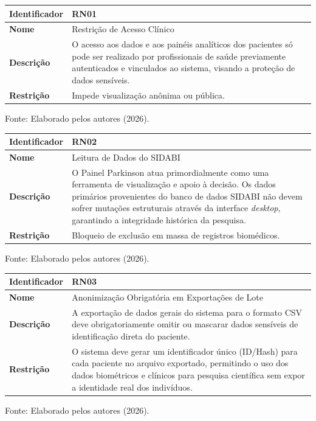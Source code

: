 \begin{quadro}[htb]
\centering
\caption{Especificação da Regra de Negócio 01 (RN01) - Controle de Acesso}
\label{quadro:rn01}
\begin{tabular}{|l|p{11cm}|}
\hline
\textbf{Identificador} & \textbf{RN01} \\ \hline
\textbf{Nome} & Restrição de Acesso Clínico \\ \hline
\textbf{Descrição} & O acesso aos dados e aos painéis analíticos dos pacientes só pode ser realizado por profissionais de saúde previamente autenticados e vinculados ao sistema, visando a proteção de dados sensíveis. \\ \hline
\textbf{Restrição} & Impede visualização anônima ou pública. \\ \hline
\end{tabular}
\centerline{\footnotesize Fonte: Elaborado pelos autores (2026).}
\end{quadro}

\begin{quadro}[htb]
\centering
\caption{Especificação da Regra de Negócio 02 (RN02) - Integridade da Origem}
\label{quadro:rn02}
\begin{tabular}{|l|p{11cm}|}
\hline
\textbf{Identificador} & \textbf{RN02} \\ \hline
\textbf{Nome} & Leitura de Dados do SIDABI \\ \hline
\textbf{Descrição} & O Painel Parkinson atua primordialmente como uma ferramenta de visualização e apoio à decisão. Os dados primários provenientes do banco de dados SIDABI não devem sofrer mutações estruturais através da interface \textit{desktop}, garantindo a integridade histórica da pesquisa. \\ \hline
\textbf{Restrição} & Bloqueio de exclusão em massa de registros biomédicos. \\ \hline
\end{tabular}
\centerline{\footnotesize Fonte: Elaborado pelos autores (2026).}
\end{quadro}

\begin{quadro}[htb]
\centering
\caption{Especificação da Regra de Negócio 03 (RN03) - Anonimização em Exportações}
\label{quadro:rn03}
\begin{tabular}{|l|p{11cm}|}
\hline
\textbf{Identificador} & \textbf{RN03} \\ \hline
\textbf{Nome} & Anonimização Obrigatória em Exportações de Lote \\ \hline
\textbf{Descrição} & A exportação de dados gerais do sistema para o formato CSV deve obrigatoriamente omitir ou mascarar dados sensíveis de identificação direta do paciente. \\ \hline
\textbf{Restrição} & O sistema deve gerar um identificador único (ID/Hash) para cada paciente no arquivo exportado, permitindo o uso dos dados biométricos e clínicos para pesquisa científica sem expor a identidade real dos indivíduos. \\ \hline
\end{tabular}
\centerline{\footnotesize Fonte: Elaborado pelos autores (2026).}
\end{quadro}

